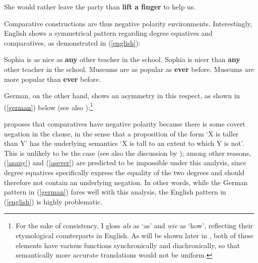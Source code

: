 \ea She would rather leave the party than \textbf{lift a finger} to help us. \label{finger}
\z

Comparative constructions are thus negative polarity environments. Interestingly, English shows a symmetrical pattern regarding degree equatives and comparatives, as demonstrated in (\ref{english}):

\ea \label{english}
\ea Sophia is as nice as \textbf{any} other teacher in the school. \label{asany}
\ex Sophia is nicer than \textbf{any} other teacher in the school. \label{thanany}
\ex Museums are as popular as \textbf{ever} before. \label{asever}
\ex Museums are more popular than \textbf{ever} before. \label{thanever}
\z
\z

German, on the other hand, shows an asymmetry in this respect, as shown in (\ref{german}) below (see also \citealt{hohauszimmermann2021}):\footnote{For the sake of consistency, I gloss \textit{als} as `as' and \textit{wie} as `how', reflecting their etymological counterparts in English. As will be shown later in , both of these elements have various functions synchronically and diachronically, so that semantically more accurate translations would not be uniform.}

\ea \label{german}
\z
\z

\citet[531--532]{seuren1973} proposes that comparatives have negative polarity because there is some covert negation in the clause, in the sense that a proposition of the form `X is taller than Y' has the underlying semantics `X is tall to an extent to which Y is not'. This is unlikely to be the case (see also the discussion by \citealt{jaeger2018}); among other reasons, (\ref{asany}) and (\ref{asever}) are predicted to be impossible under this analysis, since degree equatives specifically express the equality of the two degrees and should therefore not contain an underlying negation. In other words, while the German pattern in (\ref{german}) fares well with this analysis, the English pattern in (\ref{english}) is highly problematic.

